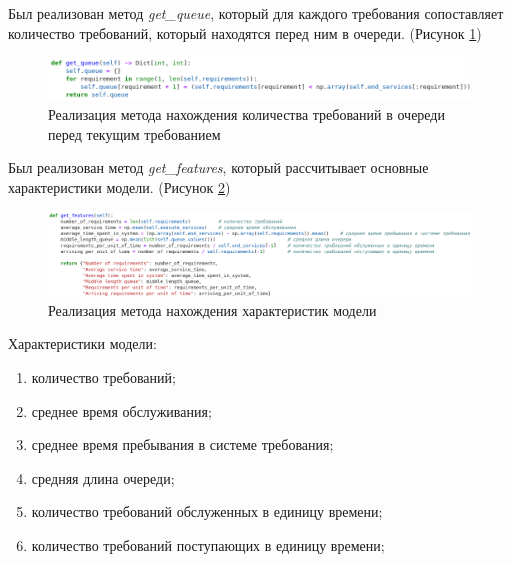 \documentclass[14pt,fleqn]{extarticle}
\begin{document}
	\newpage
	Был реализован метод \textit{get\textup{\_}queue}, который для каждого требования сопоставляет количество требований, который находятся перед ним в очереди. (Рисунок \ref{fig:queuing_system_with_infinity_queue_get_queue})
	\begin{figure}[h]
		\centering \includegraphics[scale=0.62]{queuing_system_with_infinity_queue_get_queue}
		\caption{Реализация метода нахождения количества требований в очереди перед текущим требованием}
		\label{fig:queuing_system_with_infinity_queue_get_queue}
	\end{figure}

	Был реализован метод \textit{get\textup{\_}features}, который рассчитывает основные характеристики модели. (Рисунок \ref{fig:queuing_system_with_infinity_queue_get_features})
	\begin{figure}[h]
		\centering \includegraphics[scale=0.62]{queuing_system_with_infinity_queue_get_features}
		\caption{Реализация метода нахождения характеристик модели}
		\label{fig:queuing_system_with_infinity_queue_get_features}
	\end{figure}

	Характеристики модели:
 	\begin{enumerate}[topsep=0pt,itemsep=-1ex,partopsep=1ex,parsep=1ex]
		\item количество требований;
		\item среднее время обслуживания;
		\item среднее время пребывания в системе требования;
		\item средняя длина очереди;
		\item количество требований обслуженных в единицу времени;
		\item количество требований поступающих в единицу времени;
	\end{enumerate}
\end{document}
